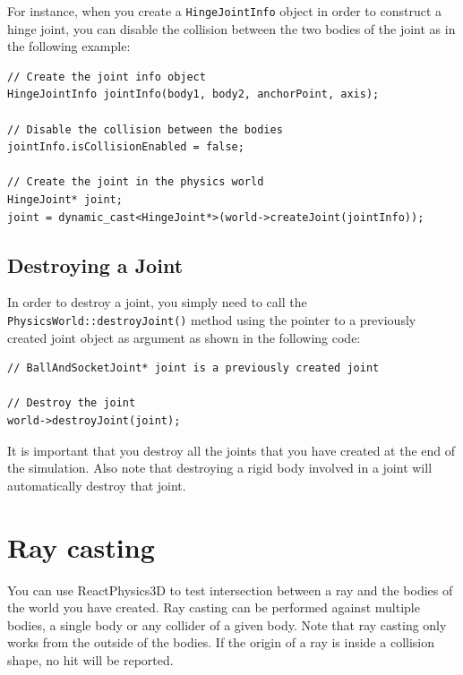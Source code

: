 \documentclass[a4paper,12pt]{article}
\begin{document}
    For instance, when you create a \texttt{HingeJointInfo} object in order to construct a hinge joint, you can disable the collision between the two bodies of the joint as in the
    following example: \\

    \begin{lstlisting}
// Create the joint info object
HingeJointInfo jointInfo(body1, body2, anchorPoint, axis);

// Disable the collision between the bodies
jointInfo.isCollisionEnabled = false;

// Create the joint in the physics world
HingeJoint* joint;
joint = dynamic_cast<HingeJoint*>(world->createJoint(jointInfo));
  \end{lstlisting}

    \subsection{Destroying a Joint}

    \begin{sloppypar}
    In order to destroy a joint, you simply need to call the \texttt{PhysicsWorld::destroyJoint()} method using the pointer to
    a previously created joint object as argument as shown in the following code: \\
   \end{sloppypar}

    \begin{lstlisting}
// BallAndSocketJoint* joint is a previously created joint

// Destroy the joint
world->destroyJoint(joint);
  \end{lstlisting}

    \vspace{0.6cm}

    It is important that you destroy all the joints that you have created at the end of the simulation. Also note that destroying a
    rigid body involved in a joint will automatically destroy that joint.

    \section{Ray casting}
    \label{sec:raycasting}

    You can use ReactPhysics3D to test intersection between a ray and the bodies of the world you have created. Ray casting can be performed against
    multiple bodies, a single body or any collider of a given body. Note that ray casting only works from the outside of the bodies. If the origin
    of a ray is inside a collision shape, no hit will be reported. \\
\end{document}
